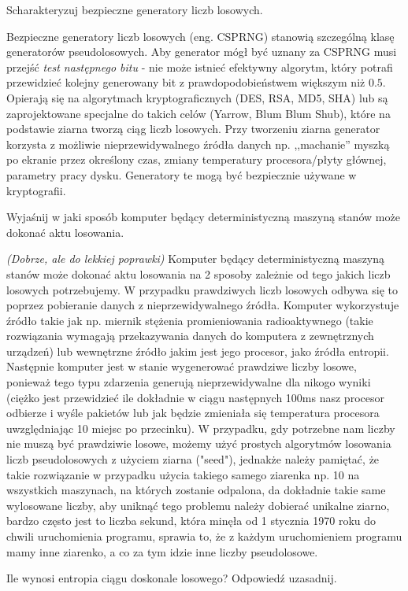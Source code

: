 \documentclass[answers,11pt]{exam}
\newcommand{\fixit}{\textit{(Dobrze, ale do lekkiej poprawki)} }
\begin{document}
\begin{questions}
\question Scharakteryzuj bezpieczne generatory liczb losowych.
\begin{solution}
Bezpieczne generatory liczb losowych (eng. CSPRNG) stanowią szczególną klasę generatorów pseudolosowych. Aby generator mógł być uznany za CSPRNG musi przejść \textit{test następnego bitu} - nie może istnieć efektywny algorytm, który potrafi przewidzieć kolejny generowany bit z prawdopodobieństwem większym niż $0.5$. Opierają się na algorytmach kryptograficznych (DES, RSA, MD5, SHA) lub są zaprojektowane specjalne do takich celów (Yarrow, Blum Blum Shub), które na podstawie ziarna tworzą ciąg liczb losowych. Przy tworzeniu ziarna generator korzysta z możliwie nieprzewidywalnego źródła danych np. ,,machanie'' myszką po ekranie przez określony czas, zmiany temperatury procesora/płyty głównej, parametry pracy dysku. Generatory te mogą być bezpiecznie używane w kryptografii. 
\end{solution}


\question Wyjaśnij w jaki sposób komputer będący deterministyczną maszyną stanów może dokonać aktu losowania.
\begin{solution}
\fixit
Komputer będący deterministyczną maszyną stanów może dokonać aktu losowania na 2 sposoby zależnie od tego jakich liczb losowych potrzebujemy. W przypadku prawdziwych liczb losowych odbywa się to poprzez pobieranie danych z nieprzewidywalnego źródła. Komputer wykorzystuje źródło takie jak np. miernik stężenia promieniowania radioaktywnego (takie rozwiązania wymagają przekazywania danych do komputera z zewnętrznych urządzeń) lub wewnętrzne źródło jakim jest jego procesor, jako źródła entropii. Następnie komputer jest w stanie wygenerować prawdziwe liczby losowe, ponieważ tego typu zdarzenia generują nieprzewidywalne dla nikogo wyniki (ciężko jest przewidzieć ile dokładnie w ciągu następnych 100ms nasz procesor odbierze i wyśle pakietów lub jak będzie zmieniała się temperatura procesora uwzględniając 10 miejsc po przecinku). W przypadku, gdy potrzebne nam liczby nie muszą być prawdziwie losowe, możemy użyć prostych algorytmów losowania liczb pseudolosowych z użyciem ziarna ("seed"), jednakże należy pamiętać, że takie rozwiązanie w przypadku użycia takiego samego ziarenka np. 10 na wszystkich maszynach, na których zostanie odpalona, da dokładnie takie same wylosowane liczby, aby uniknąć tego problemu należy dobierać unikalne ziarno, bardzo często jest to liczba sekund, która minęła od 1 stycznia 1970 roku do chwili uruchomienia programu, sprawia to, że z każdym uruchomieniem programu mamy inne ziarenko, a co za tym idzie inne liczby pseudolosowe. 
\end{solution}

\question Ile wynosi entropia ciągu doskonale losowego? Odpowiedź uzasadnij.


\end{questions}
\end{document}
